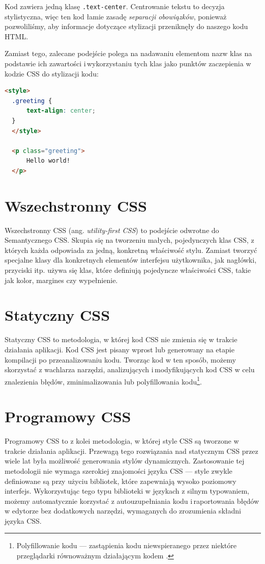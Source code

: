 \documentclass[a4paper,12pt]{book} %
\begin{document}
Kod zawiera jedną klasę \lstinline{.text-center}. Centrowanie tekstu to decyzja stylistyczna, więc ten kod łamie zasadę \textit{separacji obowiązków}, ponieważ pozwoliliśmy, aby informacje dotyczące stylizacji przeniknęły do naszego kodu HTML.

Zamiast tego, zalecane podejście polega na nadawaniu elementom nazw klas na podstawie ich zawartości i\,wykorzystaniu tych klas jako punktów zaczepienia w kodzie CSS do stylizacji kodu:
\begin{lstlisting}[language=HTML]
  <style>
  .greeting {
      text-align: center;
  }
  </style>
  
  <p class="greeting">
      Hello world!
  </p>
\end{lstlisting}

\section{Wszechstronny CSS}
Wszechstronny CSS (ang. \emph{utility-first CSS}) to podejście odwrotne do Semantycznego CSS. Skupia się na tworzeniu małych, pojedynczych klas CSS, z których każda odpowiada za jedną, konkretną właściwość stylu. Zamiast tworzyć specjalne klasy dla konkretnych elementów interfejsu użytkownika, jak nagłówki, przyciski itp. używa się klas, które definiują pojedyncze właściwości CSS, takie jak kolor, margines czy wypełnienie.

\section{Statyczny CSS}
Statyczny CSS to metodologia, w której kod CSS nie zmienia się w trakcie działania aplikacji. Kod CSS jest pisany wprost lub generowany na etapie kompilacji po przeanalizowaniu kodu. Tworząc kod w ten sposób, możemy skorzystać z wachlarza narzędzi, analizujących i\,modyfikujących kod CSS w celu znalezienia błędów, zminimalizowania lub polyfillowania kodu\footnote{Polyfillowanie kodu --- zastąpienia kodu niewspieranego przez niektóre przeglądarki równoważnym działającym kodem \cite{Lawson2011-fr}.}.
\section{Programowy CSS}
Programowy CSS to z kolei metodologia, w której style CSS są tworzone w trakcie działania aplikacji. Przewagą tego rozwiązania nad statycznym CSS przez wiele lat była możliwość generowania stylów dynamicznych. Zastosowanie tej metodologii nie wymaga szerokiej znajomości języka CSS --- style zwykle definiowane są przy użyciu bibliotek, które zapewniają wysoko poziomowy interfejs. Wykorzystując tego typu biblioteki w językach z silnym typowaniem, możemy automatycznie korzystać z autouzupełniania kodu i\,raportowania błędów w edytorze bez dodatkowych narzędzi, wymaganych do zrozumienia składni języka CSS.
\end{document}
